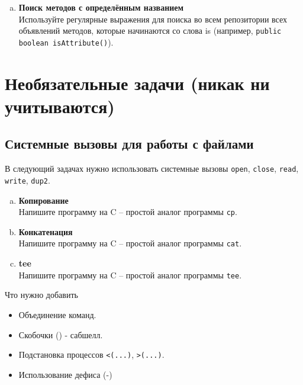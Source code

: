 \documentclass{article}
\begin{document}
\begin{enumerate}[a.]
 
\item \textbf{Поиск методов с определённым названием}\\
Используйте регулярные выражения для поиска во всем репозитории всех объявлений методов, которые начинаются со слова is (например, \texttt{public boolean isAttribute()}).




\end{enumerate}


\newpage
\section{Необязательные задачи (никак ни учитываются)}
\subsection{Системные вызовы для работы с файлами}
В следующий задачах нужно использовать системные вызовы \texttt{open}, \texttt{close}, \texttt{read}, \texttt{write}, \texttt{dup2}.
\begin{enumerate}[a.]
\item \textbf{Копирование}\\
Напишите программу на C -- простой аналог программы \texttt{cp}.
\item \textbf{Конкатенация}\\
Напишите программу на C -- простой аналог программы \texttt{cat}.
\item \textbf{tee}\\
Напишите программу на C -- простой аналог программы \texttt{tee}.
\end{enumerate}


\newpage
Что нужно добавить
\begin{itemize}
\item  Объединение команд.
\item  Скобочки () - сабшелл.
\item  Подстановка процессов \texttt{<(...)}, \texttt{>(...)}.
\item  Использование дефиса (-)
\end{itemize}
\end{document}
